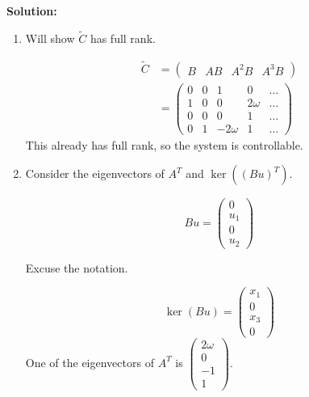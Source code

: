 \documentclass[12pt]{article}
\newenvironment{solution}{
    \textbf{Solution:}
    
}{
    
    \vspace{2em}
}
\begin{document}
\begin{solution}
    \begin{enumerate}[label=(\alph*)]
        \item Will show \(\tilde{C}\) has full rank.
        
        \[
            \begin{aligned}
                \tilde{C} &= \begin{pmatrix}
                    B & AB & A^2B & A^3B
                \end{pmatrix}\\
                &= \begin{pmatrix}
                    0 & 0 & 1 & 0 & \dots\\
                    1 & 0 & 0 & 2\omega & \dots\\
                    0 & 0 & 0 & 1 & \dots\\
                    0 & 1 & -2\omega & 1 & \dots
                \end{pmatrix}
            \end{aligned}
        \]
        This already has full rank, so the system is controllable.

        \item Consider the eigenvectors of \(A^T\) and \(\ker((Bu)^T)\).
        
        \[
            Bu = \begin{pmatrix}
                0\\
                u_1\\
                0\\
                u_2
            \end{pmatrix}
        \]

        Excuse the notation.

        \[
            \ker(Bu) = \begin{pmatrix}
                x_1\\
                0\\
                x_3\\
                0
            \end{pmatrix}
        \]
        One of the eigenvectors of \(A^T\) is \(\begin{pmatrix}
            2\omega\\
            0\\
            -1\\
            1
        \end{pmatrix}\).


\end{enumerate}
\end{solution}
\end{document}
